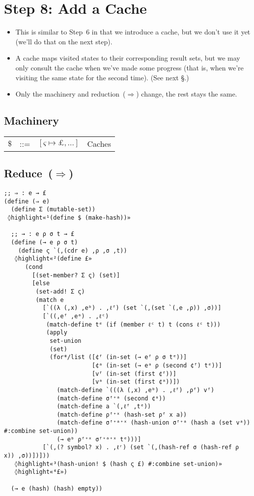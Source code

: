 \documentclass[12pt, oneside]{book}
\begin{document}
\section{Step 8: Add a Cache}

\begin{itemize}
  \item This is similar to Step~6 in that we introduce a cache, but we don’t use it yet (we’ll do that on the next step).
  \item A cache maps visited states to their corresponding result sets, but we may only consult the cache when we’ve made some progress (that is, when we’re visiting the same state for the second time). (See next §.)
  \item Only the machinery and reduction~(\(⇒\)) change, the rest stays the same.
\end{itemize}

\subsection{Machinery}

\begin{tabular}{rcll}
  \(\$\) & ::= & \([ς ↦ £, ...]\) & Caches \\
\end{tabular}

\subsection{Reduce~(\(⇒\))}

\begin{Verbatim}
;; ⇒ : e → £
(define (⇒ e)
  (define Σ (mutable-set))
 ◊highlight«¹(define $ (make-hash))»

  ;; → : e ρ σ t → £
  (define (→ e ρ σ t)
    (define ς `(,(cdr e) ,ρ ,σ ,t))
   ◊highlight«²(define £»
      (cond
        [(set-member? Σ ς) (set)]
        [else
         (set-add! Σ ς)
         (match e
           [`((λ (,x) ,eᵇ) . ,ℓᶠ) (set `(,(set `(,e ,ρ)) ,σ))]
           [`((,eᶠ ,eᵃ) . ,ℓᶜ)
            (match-define tᵉ (if (member ℓᶜ t) t (cons ℓᶜ t)))
            (apply
             set-union
             (set)
             (for*/list ([¢ᶠ (in-set (→ eᶠ ρ σ tᵉ))]
                         [¢ᵃ (in-set (→ eᵃ ρ (second ¢ᶠ) tᵉ))]
                         [vᶠ (in-set (first ¢ᶠ))]
                         [vᵃ (in-set (first ¢ᵃ))])
               (match-define `(((λ (,x) ,eᵇ) . ,ℓᶠ) ,ρᶠ) vᶠ)
               (match-define σᶠ⁺ᵃ (second ¢ᵃ))
               (match-define a `(,ℓᶠ ,tᵉ))
               (match-define ρᶠ⁺ˣ (hash-set ρᶠ x a))
               (match-define σᶠ⁺ᵃ⁺ˣ (hash-union σᶠ⁺ᵃ (hash a (set vᵃ)) #:combine set-union))
               (→ eᵇ ρᶠ⁺ˣ σᶠ⁺ᵃ⁺ˣ tᵉ)))]
           [`(,(? symbol? x) . ,ℓʳ) (set `(,(hash-ref σ (hash-ref ρ x)) ,σ))])]))
   ◊highlight«³(hash-union! $ (hash ς £) #:combine set-union)»
   ◊highlight«⁴£»)

  (→ e (hash) (hash) empty))
\end{Verbatim}
\end{document}
